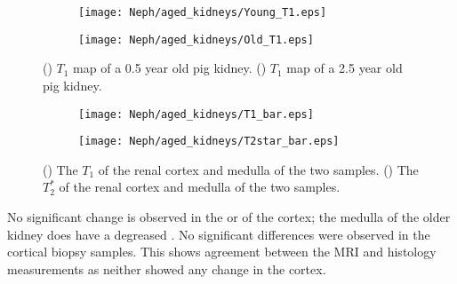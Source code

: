 \begin{figure}[H]
	\centering
	\begin{subfigure}[c]{0.47\textwidth}
		\centering
		\texttt{[image: Neph/aged\_kidneys/Young\_T1.eps]}
		\caption{}
		\label{fig:ex_aged_t1_map}
	\end{subfigure}
	\hfill
	\begin{subfigure}[c]{0.47\textwidth}
		\centering
		\texttt{[image: Neph/aged\_kidneys/Old\_T1.eps]}
		\caption{}
		\label{fig:ex_aged_t2star_map}
	\end{subfigure}
	\caption{() $T_1$ map of a 0.5 year old pig kidney. () $T_1$ map of a 2.5 year old pig kidney.}
	\label{fig:ex_aged_map}
\end{figure}

\begin{figure}[H]
	\centering
	\begin{subfigure}[c]{0.47\textwidth}
		\centering
		\texttt{[image: Neph/aged\_kidneys/T1\_bar.eps]}
		\caption{}
		\label{fig:ex_aged_t1_bar}
	\end{subfigure}
	\hfill
	\begin{subfigure}[c]{0.47\textwidth}
		\centering
		\texttt{[image: Neph/aged\_kidneys/T2star\_bar.eps]}
		\caption{}
		\label{fig:ex_aged_t2star_bar}
	\end{subfigure}
	\caption{() The $T_1$ of the renal cortex and medulla of the two samples. () The $T_2^*$ of the renal cortex and medulla of the two samples.}
	\label{fig:ex_aged_bar}
\end{figure}

No significant change is observed in the \tone or \ttwostar of the cortex; the medulla of the older kidney does have a degreased \tone. No significant differences were observed in the cortical biopsy samples. This shows agreement between the \ac{MRI} and histology measurements as neither showed any change in the cortex. 

